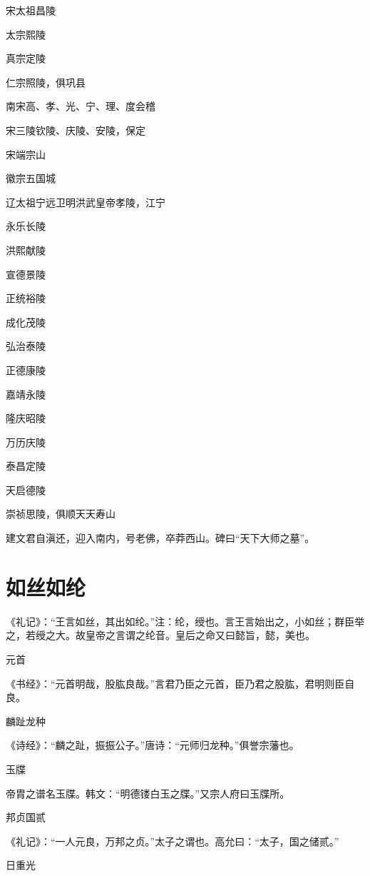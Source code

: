 \documentclass[a4paper,12pt,UTF8,twoside]{ctexbook}
\begin{document}
    宋太祖昌陵
    
    太宗熙陵
    
    真宗定陵
    
    仁宗照陵，俱巩县
    
    南宋高、孝、光、宁、理、度会稽
    
    宋三陵钦陵、庆陵、安陵，保定
    
    宋端宗山
    
    徽宗五国城
    
    辽太祖宁远卫明洪武皇帝孝陵，江宁
    
    永乐长陵
    
    洪熙献陵
    
    宣德景陵
    
    正统裕陵
    
    成化茂陵
    
    弘治泰陵
    
    正德康陵
    
    嘉靖永陵
    
    隆庆昭陵
    
    万历庆陵
    
    泰昌定陵
    
    天启德陵
    
    崇祯思陵，俱顺天天寿山
    
    建文君自滇还，迎入南内，号老佛，卒莽西山。碑曰“天下大师之墓”。
    
    
    \section{如丝如纶}
    
    《礼记》：“王言如丝，其出如纶。”注：纶，绶也。言王言始出之，小如丝；群臣举之，若绶之大。故皇帝之言谓之纶音。皇后之命又曰懿旨，懿，美也。
    
    元首
    
    《书经》：“元首明哉，股肱良哉。”言君乃臣之元首，臣乃君之股肱，君明则臣自良。
    
    麟趾龙种
    
    《诗经》：“麟之趾，振振公子。”唐诗：“元师归龙种。”俱誉宗藩也。
    
    玉牒
    
    帝胄之谱名玉牒。韩文：“明德镂白玉之牒。”又宗人府曰玉牒所。
    
    邦贞国贰
    
    《礼记》：“一人元良，万邦之贞。”太子之谓也。高允曰：“太子，国之储贰。”
    
    日重光
    
\end{document}
